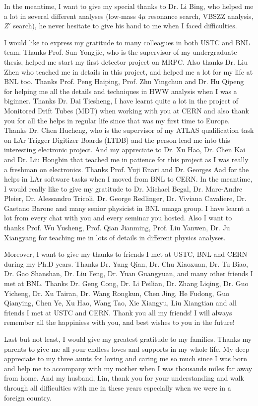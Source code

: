 \begin{acknowledgments}
In the meantime, I want to give my special thanks to Dr. Li Bing, who helped me a lot in several different analyses 
(low-mass 4$\mu$ resonance search, VBSZZ analysis, $Z'$ search), he never hesitate to give his hand to me when I faced difficulties.

I would like to express my gratitude to many colleagues in both USTC and BNL team.
Thanks Prof. Sun Yongjie, who is the supervisor of my undergraduate thesis, helped me start my first detector project on MRPC. 
Also thanks Dr. Liu Zhen who teached me in details in this project, and helped me a lot for my life at BNL too.
Thanks Prof. Peng Haiping, Prof. Zhu Yingchun and Dr. Hu Qipeng for helping me all the details and techniques in HWW analysis when I was a biginner.
Thanks Dr. Dai Tiesheng, I have learnt quite a lot in the project of Monitored Drift Tubes (MDT) when working with you at CERN and also thank you for all the helps in regular life since that was my first time to Europe.
Thanks Dr. Chen Hucheng, who is the supervisor of my ATLAS qualification task on LAr Trigger Digitizer Boards (LTDB) and the person lead me into this interesting electronic project.
And my appreciate to Dr. Xu Hao, Dr. Chen Kai and Dr. Liu Hongbin that teached me in patience for this project as I was really a freshman on electronics.
Thanks Prof. Yuji Enari and Dr. Georges Aad for the helps in LAr software tasks when I moved from BNL to CERN.
In the meantime, I would really like to give my gratitude to Dr. Michael Begal, Dr. Marc-Andre Pleier, Dr. Alessandro Tricoli, Dr. George Redlinger, Dr. Viviana Cavaliere, Dr. Gaetano Barone and many senior physicist in BNL omaga group. I have learnt a lot from every chat with you and every seminar you hosted.
Also I want to thanks Prof. Wu Yusheng, Prof. Qian Jianming, Prof. Liu Yanwen, Dr. Ju Xiangyang for teaching me in lots of details in different physics analyses.

Moreover, I want to give my thanks to friends I met at USTC, BNL and CERN during my Ph.D years.
Thanks Dr. Yang Qian, Dr. Chu Xiaoxuan, Dr. Tu Biao, Dr. Gao Shanshan, Dr. Liu Feng, Dr. Yuan Guangyuan, and many other friends I met at BNL. 
Thanks Dr. Geng Cong, Dr. Li Peilian, Dr. Zhang Liqing, Dr. Guo Yicheng, Dr. Xu Tairan, Dr. Wang Rongkun, Chen Jing, He Fudong, Guo Qianying, Chen Ye, Xu Hao, Wang Tao, Xie Xiangyu, Liu Xiangtian and all friends I met at USTC and CERN. 
Thank you all my friends! I will always remember all the happiniess with you, and best wishes to you in the future!

Last but not least, I would give my greatest gratitude to my families. Thanks my parents to give me all your endless loves and supports in my whole life.
My deep appreciate to my three aunts for loving and caring me so much since I was born and help me to accompany with my mother when I was thousands miles far away from home.
And my husband, Lin, thank you for your understanding and walk through all difficulties with me in these years especially when we were in a foreign country.

\end{acknowledgments}
